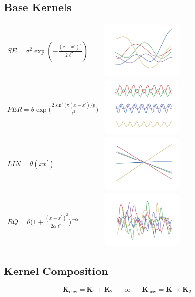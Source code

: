 \documentclass[a0,portrait]{a0poster}
\begin{document}
\begin{multicols}{3}
\subsection*{Base Kernels}
 \begin{center} 
\begin{tabular}{m{11.5cm} m{4cm}}
\small
$SE = \sigma^2 \exp(-\frac{(x-x^\prime)^2}{2\ell^2})$&\includegraphics[width=4cm]{gpSamples/se.png} \\
$PER = \theta \exp \bigg( \frac{2 \sin^2 ( \pi (x - x^\prime)/p}{\ell^2} \bigg)$&\includegraphics[width=4cm]{gpSamples/per.png}\\
$LIN = \theta (x x^\prime)$                          &\includegraphics[width=4cm]{gpSamples/lin.png}\\
$RQ =   \theta \bigg(1 + \frac{(x - x^\prime)^2}{2 \alpha \ell^2} \bigg)^{-\alpha}$&\includegraphics[width=4cm]{gpSamples/rq.png}
\end{tabular}
\end{center}
\subsection*{Kernel Composition}
\begin{equation*}
\mathbf{K}_{\textrm{new}} = \mathbf{K}_1 + \mathbf{K}_2 \;\;\;\;\;\;\text{or}\;\;\;\;\;\; \mathbf{K}_{\textrm{new}} = \mathbf{K}_1 \times \mathbf{K}_2 
\end{equation*}


\end{multicols}
\end{document}
